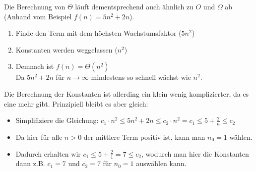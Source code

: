\documentclass[
../../AuD-Zusammenfassung.tex,
]
{subfiles}
\begin{document}
Die Berechnung von $\Theta$ läuft dementsprechend auch ähnlich zu $O$ und $\Omega$ ab (Anhand vom Beispiel $f(n) = 5n^2 + 2n$). 
\begin{enumerate}
    \item Finde den Term mit dem höchsten Wachstumsfaktor ($5n^2$)
    \item Konstanten werden weggelassen ($n^2$)
    \item Demnach ist $f(n) = \Theta(n^2)$\\
    Da $5n^2 + 2n$ für $n \to \infty$ mindestens so schnell wächst wie $n^2$.
\end{enumerate}
Die Berechnung der Konstanten ist allerding ein klein wenig komplizierter, da es eine mehr gibt. Prinzipiell bleibt es aber gleich:
\begin{itemize}
    \item Simplifiziere die Gleichung: $c_1 \cdot n^2 \leq 5n^2 + 2n \leq c_2 \cdot n^2 = c_1 \leq 5 + \frac{2}{n} \leq c_2$
    \item Da hier für alle $n > 0$ der mittlere Term positiv ist, kann man $n_0 = 1$ wählen. 
    \item Dadurch erhalten wir $c_1 \leq 5 + \frac{2}{1} = 7 \leq c_2$, wodurch man hier die Konstanten dann z.B. $c_1 = 7$ und $c_2 = 7$ für $n_0 = 1$ auswählen kann.
\end{itemize}
\end{document}
